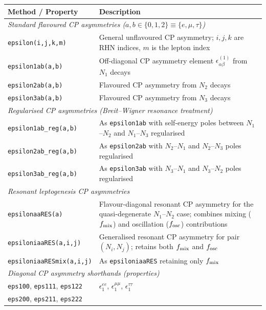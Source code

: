 \documentclass[12pt, a4paper]{article}
\begin{document}
\begin{table}[H]
\centering\small
\renewcommand{\arraystretch}{1.25}
\begin{tabular}{p{5.2cm} p{8.8cm}}
\hline
\textbf{Method / Property} & \textbf{Description} \\
\hline
\multicolumn{2}{l}{\textit{Standard flavoured CP asymmetries
  ($a,b\in\{0,1,2\}\equiv\{e,\mu,\tau\}$)}} \\
\texttt{epsilon(i,j,k,m)}
  & General unflavoured CP asymmetry; $i,j,k$ are RHN indices, $m$ is the lepton index \\
\texttt{epsilon1ab(a,b)}
  & Off-diagonal CP asymmetry element $\epsilon^{(1)}_{\alpha\beta}$ from $N_1$ decays \\
\texttt{epsilon2ab(a,b)} & Flavoured CP asymmetry from $N_2$ decays \\
\texttt{epsilon3ab(a,b)} & Flavoured CP asymmetry from $N_3$ decays \\
\hline
\multicolumn{2}{l}{\textit{Regularised CP asymmetries (Breit--Wigner resonance treatment)}} \\
\texttt{epsilon1ab\_reg(a,b)}
  & As \texttt{epsilon1ab} with self-energy poles between $N_1$--$N_2$
    and $N_1$--$N_3$ regularised \\
\texttt{epsilon2ab\_reg(a,b)}
  & As \texttt{epsilon2ab} with $N_2$--$N_1$ and $N_2$--$N_3$ poles regularised \\
\texttt{epsilon3ab\_reg(a,b)}
  & As \texttt{epsilon3ab} with $N_3$--$N_1$ and $N_3$--$N_2$ poles regularised \\
\hline
\multicolumn{2}{l}{\textit{Resonant leptogenesis CP asymmetries}} \\
\texttt{epsilonaaRES(a)}
  & Flavour-diagonal resonant CP asymmetry for the quasi-degenerate $N_1$--$N_2$ case;
    combines mixing ($f_{\rm mix}$) and oscillation ($f_{\rm osc}$) contributions \\
\texttt{epsiloniaaRES(a,i,j)}
  & Generalised resonant CP asymmetry for pair $(N_i,N_j)$;
    retains both $f_{\rm mix}$ and $f_{\rm osc}$ \\
\texttt{epsiloniaaRESmix(a,i,j)}
  & As \texttt{epsiloniaaRES} retaining only $f_{\rm mix}$ \\
\hline
\multicolumn{2}{l}{\textit{Diagonal CP asymmetry shorthands (properties)}} \\
\texttt{eps100}, \texttt{eps111}, \texttt{eps122}
  & $\epsilon_1^{ee}$,\; $\epsilon_1^{\mu\mu}$,\; $\epsilon_1^{\tau\tau}$ \\
\texttt{eps200}, \texttt{eps211}, \texttt{eps222}

\end{tabular}
\end{table}
\end{document}
